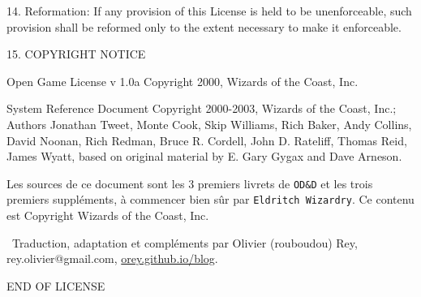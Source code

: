 \documentclass[11pt]{article}
\begin{document}
\bigskip

14. Reformation: If any provision of this License is held to be unenforceable, such provision shall be reformed only to the extent necessary to make it enforceable.

\bigskip

15. COPYRIGHT NOTICE

\bigskip

Open Game License v 1.0a Copyright 2000, Wizards of the Coast, Inc.

\bigskip

System Reference Document Copyright 2000-2003, Wizards of the Coast, Inc.; Authors Jonathan Tweet, Monte Cook, Skip Williams, Rich Baker, Andy Collins, David Noonan, Rich Redman, Bruce R. Cordell, John D. Rateliff, Thomas Reid, James Wyatt, based on original material by E. Gary Gygax and Dave Arneson.

\bigskip

Les sources de ce document sont les 3 premiers livrets de \texttt{OD\&D} et les trois premiers suppléments, à commencer bien sûr par \texttt{Eldritch Wizardry}. Ce contenu est Copyright Wizards of the Coast, Inc.

\bigskip

\textcopyright\ Traduction, adaptation et compléments par Olivier (rouboudou) Rey, rey.olivier@gmail.com, \linebreak \href{https://orey.github.io/blog}{orey.github.io/blog}.

\bigskip

END OF LICENSE
\end{document}
